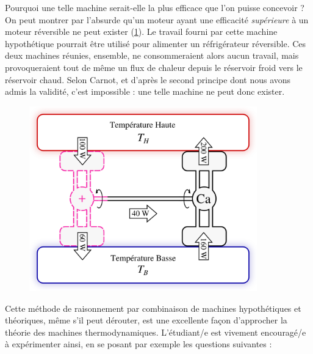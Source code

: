 		Pourquoi une telle machine serait-elle la plus efficace que l’on puisse concevoir ? On peut montrer par l’absurde qu’un moteur ayant une efficacité \emph{supérieure} à un moteur réversible ne peut exister (\cref{fig_plus_que_machine_de_carnot}). Le travail fourni par cette machine hypothétique pourrait être utilisé pour alimenter un réfrigérateur réversible. Ces deux machines réunies, ensemble, ne consommeraient alors aucun travail, mais provoqueraient tout de même un flux de chaleur depuis le réservoir froid vers le réservoir chaud. Selon Carnot, et d’après le second principe dont nous avons admis la validité, c’est impossible : une telle machine ne peut donc exister.

		\begin{figure}
			\begin{center}
				\includegraphics[height=8cm]{images/carnot_moteur_plusplus.png}
			\end{center}
			\label{fig_plus_que_machine_de_carnot}
		\end{figure}

		Cette méthode de raisonnement par combinaison de machines hypothétiques et théoriques, même s’il peut dérouter, est une excellente façon d’approcher la théorie des machines thermodynamiques. L’étudiant/e est vivement encouragé/e à expérimenter ainsi, en se posant par exemple les questions suivantes :

